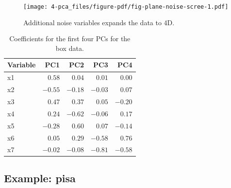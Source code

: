 \documentclass[
  letterpaper,
]{krantz}
\newenvironment{Shaded}{\begin{snugshade}}{\end{snugshade}}
\newcommand{\AttributeTok}[1]{\textcolor[rgb]{0.40,0.45,0.13}{#1}}
\newcommand{\DecValTok}[1]{\textcolor[rgb]{0.68,0.00,0.00}{#1}}
\newcommand{\FunctionTok}[1]{\textcolor[rgb]{0.28,0.35,0.67}{#1}}
\newcommand{\NormalTok}[1]{\textcolor[rgb]{0.00,0.23,0.31}{#1}}
\newcommand{\SpecialCharTok}[1]{\textcolor[rgb]{0.37,0.37,0.37}{#1}}
\newcommand{\StringTok}[1]{\textcolor[rgb]{0.13,0.47,0.30}{#1}}
\begin{document}
\begin{figure}[H]

{\centering \texttt{[image: 4-pca\_files/figure-pdf/fig-plane-noise-scree-1.pdf]}

}

\caption{\label{fig-plane-noise-scree}Additional noise variables expands
the data to 4D.}

\end{figure}

\begin{Shaded}
\end{Shaded}

\hypertarget{tbl-plane-noise-pcs}{}
\begin{longtable}{lrrrr}
\caption{\label{tbl-plane-noise-pcs}Coefficients for the first four PCs for the box data. }\tabularnewline

\toprule
Variable & PC1 & PC2 & PC3 & PC4 \\ 
\midrule
x1 & $0.58$ & $0.04$ & $0.01$ & $0.00$ \\ 
x2 & $-0.55$ & $-0.18$ & $-0.03$ & $0.07$ \\ 
x3 & $0.47$ & $0.37$ & $0.05$ & $-0.20$ \\ 
x4 & $0.24$ & $-0.62$ & $-0.06$ & $0.17$ \\ 
x5 & $-0.28$ & $0.60$ & $0.07$ & $-0.14$ \\ 
x6 & $0.05$ & $0.29$ & $-0.58$ & $0.76$ \\ 
x7 & $-0.02$ & $-0.08$ & $-0.81$ & $-0.58$ \\ 
\bottomrule
\end{longtable}

\hypertarget{example-pisa}{%
\subsection{Example: pisa}\label{example-pisa}}
\end{document}
